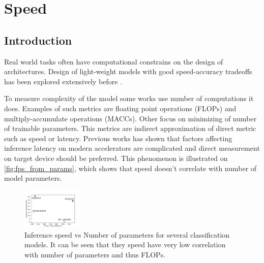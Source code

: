 \chapter{Speed} \label{chap:speed}



\section{Introduction}



Real world tasks often have computational constrains on the design of architectures. Design of light-weight models with good speed-accuracy tradeoffs has been explored extensively before \cite{howard2017_mobilenetv1} \cite{sandler2018_mobilenetv2} \cite{ma2018_shufflenetv2} \cite{zhang2018_shufflenet}.  %

To measure complexity of the model some works use number of computations it does. Examples of such metrics are floating point operations (FLOPs) and multiply-accumulate operations (MACCs). Other focus on minimizing of number of trainable parameters. This metrics are indirect approximation of direct metric such as speed or latency. Previous works has shown \cite{radosavovic2020_designing} \cite{lee2020_compounding_improvements} that factors affecting inference latency on modern accelerators are complicated and direct measurement on target device should be preferred. This phenomenon is illustrated on \autoref{fig:fps_from_params}, which shows that speed doesn't correlate with number of model parameters.   

\begin{figure} %
    \centering
    \includegraphics[width=0.26\textwidth]{images/fps_from_params.pdf}
    \caption{Inference speed vs Number of parameters for several classification models. It can be seen that they speed have very low correlation with number of parameters and thus FLOPs.}   \label{fig:fps_from_params}
\end{figure}

